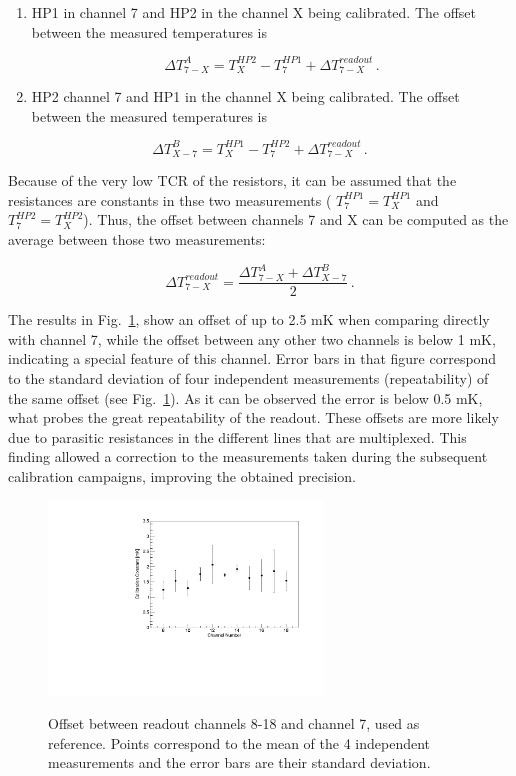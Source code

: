 \begin{enumerate}%
    \item HP1 in channel 7 and HP2 in the channel X being calibrated. The offset between the measured temperatures is

    \begin{equation}
        \Delta T_{7-X}^A = T_{X}^{HP2}-T_{7}^{HP1}+\Delta T_{7-X}^{readout} \, .
    \end{equation}

    \item HP2 channel 7 and HP1 in the channel X being calibrated. The offset between the measured temperatures is
\end{enumerate}

    \begin{equation}
        \Delta T_{X-7}^B = T_{X}^{HP1}-T_{7}^{HP2}+\Delta T_{7-X}^{readout} \, .
    \end{equation}

\noindent
Because of the very low TCR of the resistors, it can be assumed that the resistances are constants in thse two measurements ( $T_{7}^{HP1}=T_{X}^{HP1}$ and $T_{7}^{HP2}=T_{X}^{HP2}$). Thus, the offset between channels 7 and X can be computed as the average between those two measurements:

\begin{equation}
    \Delta T_{7-X}^{readout} = \frac{\Delta T^{A}_{7-X} + \Delta T^{B}_{X-7}}{2} \, .
\end{equation}

The results in Fig.~\ref{fig:readout_calib}, show an offset of up to 2.5 mK when comparing directly with channel 7, while the offset between any other two channels is below 1 mK, indicating a special feature of this channel. Error bars in that figure correspond to the standard deviation of four independent measurements (repeatability) of the same offset (see Fig.~\ref{fig:readout_calib}). As it can be observed the error is below 0.5 mK, what probes the great repeatability of the readout. These offsets are more likely due to parasitic resistances in the different lines that are multiplexed. This finding allowed a correction to the measurements taken during the subsequent calibration campaigns, improving the obtained precision.

\begin{figure}[htbp]
\centering
{\includegraphics[width=0.65\textwidth]{images/figure_3.pdf}}
\caption{Offset between readout channels 8-18 and channel 7, used as reference. Points correspond to the mean of the 4 independent measurements and the error bars are their standard deviation.}
\label{fig:readout_calib}
\end{figure}